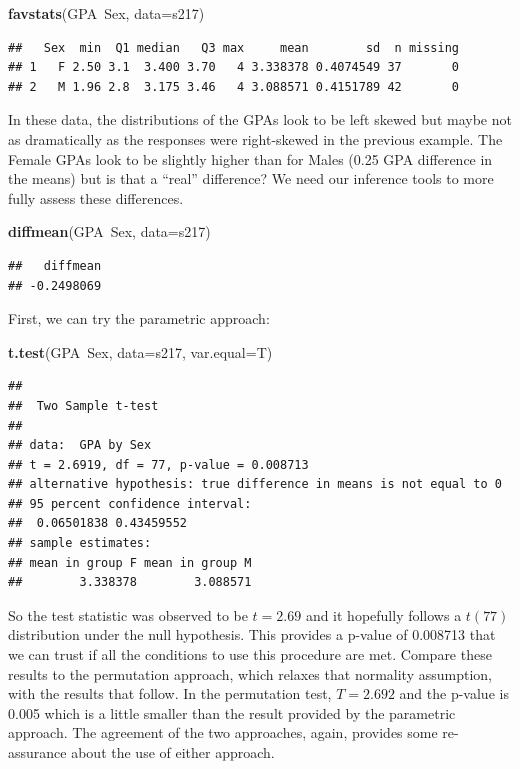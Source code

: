 \documentclass[]{book}
\newenvironment{Shaded}{\begin{snugshade}}{\end{snugshade}}
\newcommand{\KeywordTok}[1]{\textcolor[rgb]{0.13,0.29,0.53}{\textbf{{#1}}}}
\newcommand{\DataTypeTok}[1]{\textcolor[rgb]{0.13,0.29,0.53}{{#1}}}
\newcommand{\NormalTok}[1]{{#1}}
\begin{document}
\begin{Shaded}
\begin{Highlighting}[]
\KeywordTok{favstats}\NormalTok{(GPA~Sex, }\DataTypeTok{data=}\NormalTok{s217)}
\end{Highlighting}
\end{Shaded}

\begin{verbatim}
##   Sex  min  Q1 median   Q3 max     mean        sd  n missing
## 1   F 2.50 3.1  3.400 3.70   4 3.338378 0.4074549 37       0
## 2   M 1.96 2.8  3.175 3.46   4 3.088571 0.4151789 42       0
\end{verbatim}

In these data, the distributions of the GPAs look to be left skewed but
maybe not as dramatically as the responses were right-skewed in the
previous example. The Female GPAs look to be slightly higher than for
Males (0.25 GPA difference in the means) but is that a ``real''
difference? We need our inference tools to more fully assess these
differences.

\begin{Shaded}
\begin{Highlighting}[]
\KeywordTok{diffmean}\NormalTok{(GPA~Sex, }\DataTypeTok{data=}\NormalTok{s217)}
\end{Highlighting}
\end{Shaded}

\begin{verbatim}
##   diffmean 
## -0.2498069
\end{verbatim}

First, we can try the parametric approach:

\begin{Shaded}
\begin{Highlighting}[]
\KeywordTok{t.test}\NormalTok{(GPA~Sex, }\DataTypeTok{data=}\NormalTok{s217, }\DataTypeTok{var.equal=}\NormalTok{T)}
\end{Highlighting}
\end{Shaded}

\begin{verbatim}
## 
##  Two Sample t-test
## 
## data:  GPA by Sex
## t = 2.6919, df = 77, p-value = 0.008713
## alternative hypothesis: true difference in means is not equal to 0
## 95 percent confidence interval:
##  0.06501838 0.43459552
## sample estimates:
## mean in group F mean in group M 
##        3.338378        3.088571
\end{verbatim}

So the test statistic was observed to be \(t=2.69\) and it hopefully
follows a \(t(77)\) distribution under the null hypothesis. This
provides a p-value of 0.008713 that we can trust if all the conditions
to use this procedure are met. Compare these results to the permutation
approach, which relaxes that normality assumption, with the results that
follow. In the permutation test, \(T=2.692\) and the p-value is 0.005
which is a little smaller than the result provided by the parametric
approach. The agreement of the two approaches, again, provides some
re-assurance about the use of either approach.
\end{document}
